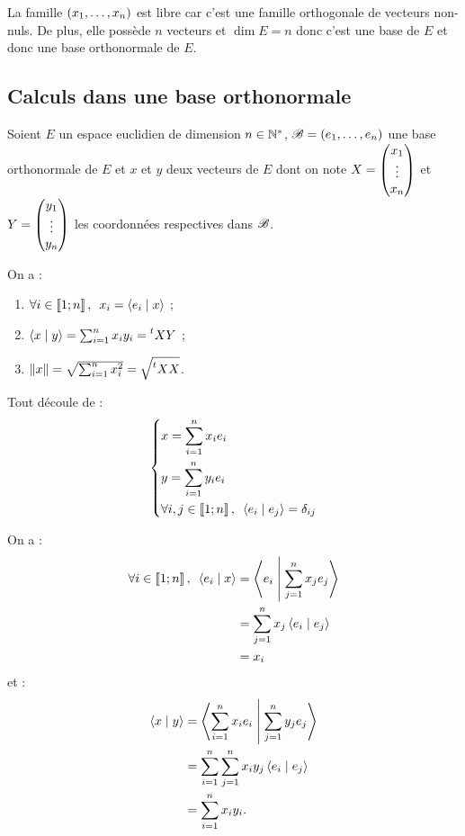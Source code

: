 \begin{dem}
La famille \(\left(x_1,\dots,x_n\right)\) est libre car c'est une famille orthogonale de vecteurs non-nuls. De plus, elle possède \(n\) vecteurs et \(\dim E=n\) donc c'est une base de \(E\) et donc une base orthonormale de \(E\).
\end{dem}

\subsection{Calculs dans une base orthonormale}

\begin{prop}
Soient \(E\) un espace euclidien de dimension \(n\in\mathbb{N}^*\), \(\mathscr{B}=\left(e_1,\dots,e_n\right)\) une base orthonormale de \(E\) et \(x\) et \(y\) deux vecteurs de \(E\) dont on note \(X=\begin{pmatrix}x_1\\\vdots\\x_n\end{pmatrix}\) et \(Y=\begin{pmatrix}y_1\\\vdots\\y_n\end{pmatrix}\) les coordonnées respectives dans \(\mathscr{B}\).

On a :

\begin{enumerate}
    \item \(\quantifs{\forall i\in\interventierii{1}{n}}x_i=\ps{e_i}{x}\) ; \\
    \item \(\left\langle x\;\middle|\; y\right\rangle=\sum_{i=1}^{n}x_iy_i=\prescript{t}{}{X}Y\) ; \\
    \item \(\left\|x\right\|=\sqrt{\sum_{i=1}^{n}x_i^2}=\sqrt{\prescript{t}{}{X}X}\).
\end{enumerate}
\end{prop}

\begin{dem}
Tout découle de : \[\begin{dcases}
x=\sum_{i=1}^{n}x_ie_i \\
y=\sum_{i=1}^{n}y_ie_i \\
\quantifs{\forall i,j\in\interventierii{1}{n}}\ps{e_i}{e_j}=\delta_{ij}
\end{dcases}\]

On a : \[\begin{aligned}
\quantifs{\forall i\in\interventierii{1}{n}}\ps{e_i}{x}&=\ps{e_i}{\sum_{j=1}^{n}x_je_j} \\
&=\sum_{j=1}^{n}x_j\ps{e_i}{e_j} \\
&=x_i
\end{aligned}\] et : \[\begin{aligned}
\left\langle x\;\middle|\; y\right\rangle&=\left\langle\sum_{i=1}^{n}x_ie_i\;\middle|\;\sum_{j=1}^{n}y_je_j\right\rangle \\
&=\sum_{i=1}^{n}\sum_{j=1}^{n}x_iy_j\left\langle e_i\;\middle|\; e_j\right\rangle \\
&=\sum_{i=1}^{n}x_iy_i.
\end{aligned}\]
\end{dem}

